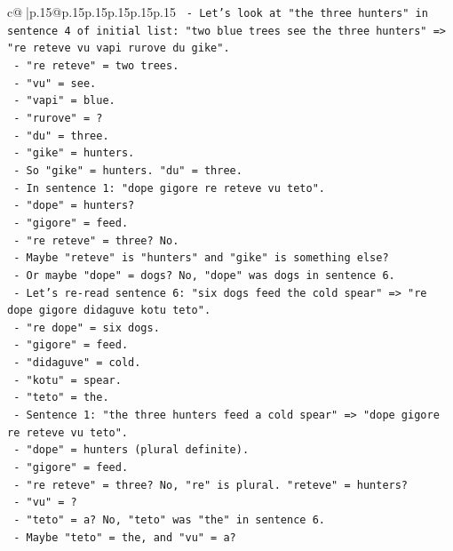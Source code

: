 \documentclass{article}
\begin{document}
{\begin{supertabular}{c@{$\;$}|p{.15\linewidth}@{}p{.15\linewidth}p{.15\linewidth}p{.15\linewidth}p{.15\linewidth}p{.15\linewidth}}
{{{\texttt{     {-} Let's look at "the three hunters" in sentence 4 of initial list: "two blue trees see the three hunters" => "re reteve vu vapi rurove du gike".} \\
\texttt{       {-} "re reteve" = two trees.} \\
\texttt{       {-} "vu" = see.} \\
\texttt{       {-} "vapi" = blue.} \\
\texttt{       {-} "rurove" = ?} \\
\texttt{       {-} "du" = three.} \\
\texttt{       {-} "gike" = hunters.} \\
\texttt{     {-} So "gike" = hunters. "du" = three.} \\
\texttt{     {-} In sentence 1: "dope gigore re reteve vu teto".} \\
\texttt{       {-} "dope" = hunters?} \\
\texttt{       {-} "gigore" = feed.} \\
\texttt{       {-} "re reteve" = three? No.} \\
\texttt{       {-} Maybe "reteve" is "hunters" and "gike" is something else?} \\
\texttt{       {-} Or maybe "dope" = dogs? No, "dope" was dogs in sentence 6.} \\
\texttt{       {-} Let's re{-}read sentence 6: "six dogs feed the cold spear" => "re dope gigore didaguve kotu teto".} \\
\texttt{         {-} "re dope" = six dogs.} \\
\texttt{         {-} "gigore" = feed.} \\
\texttt{         {-} "didaguve" = cold.} \\
\texttt{         {-} "kotu" = spear.} \\
\texttt{         {-} "teto" = the.} \\
\texttt{       {-} Sentence 1: "the three hunters feed a cold spear" => "dope gigore re reteve vu teto".} \\
\texttt{         {-} "dope" = hunters (plural definite).} \\
\texttt{         {-} "gigore" = feed.} \\
\texttt{         {-} "re reteve" = three? No, "re" is plural. "reteve" = hunters?} \\
\texttt{         {-} "vu" = ?} \\
\texttt{         {-} "teto" = a? No, "teto" was "the" in sentence 6.} \\
\texttt{         {-} Maybe "teto" = the, and "vu" = a?} \\
}}}
\end{supertabular}}
\end{document}
